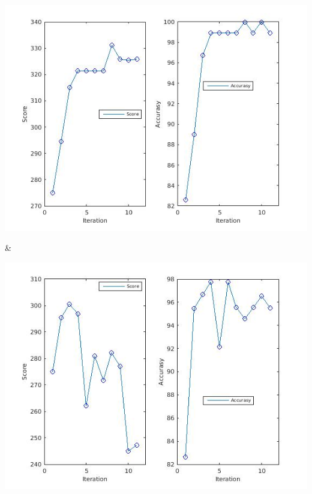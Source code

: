 \documentclass[
	fontsize=12pt,
	paper=a4,
	twoside=false,
	numbers=noenddot,
	plainheadsepline,
	toc=listof,
	toc=bibliography
]{scrartcl}
\begin{document}
\begin{landscape}
\begin{table}
\begin{tabular}
		\parbox[b]{1em}{
			\includegraphics[scale = 0.28]{fig/method1/test2/accuracy_LL.jpg}}  &
		\parbox[b]{1em}{
			\includegraphics[scale = 0.28]{fig/method2/test2/accuracy_LL.jpg}} \\
		\hline	


\end{tabular}
\end{table}
\end{landscape}
\end{document}
